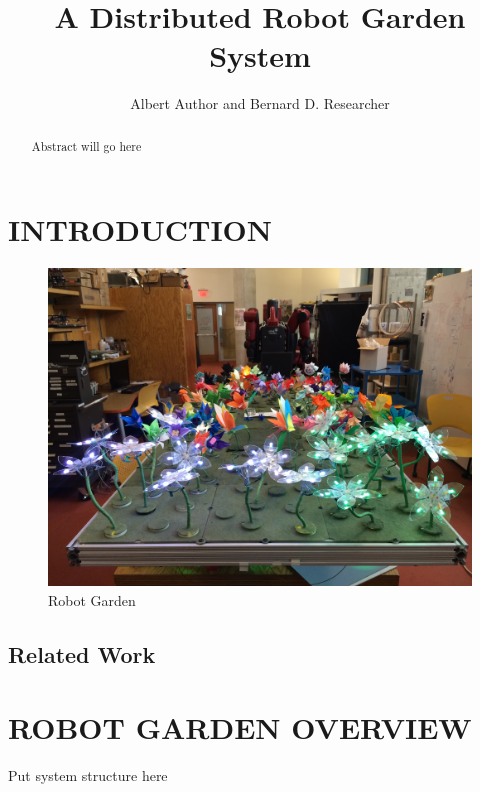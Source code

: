 \documentclass[letterpaper, 10 pt, conference]{ieeeconf}  %
\title{\LARGE \bf
A Distributed Robot Garden System
}
\author{Albert Author and Bernard D. Researcher%
}
\begin{document}
\maketitle
\thispagestyle{empty}
\pagestyle{empty}


\begin{abstract}

Abstract will go here

\end{abstract}


\section{INTRODUCTION}

\begin{figure}[thpb]
	\centering
	\includegraphics[scale=0.07]{photo_4.png}
	\caption{Robot Garden}
	\label{fig: garden}
	
\end{figure}

\subsection{\textbf{Related Work}}

\section{ROBOT GARDEN OVERVIEW}
Put system structure here
\end{document}
